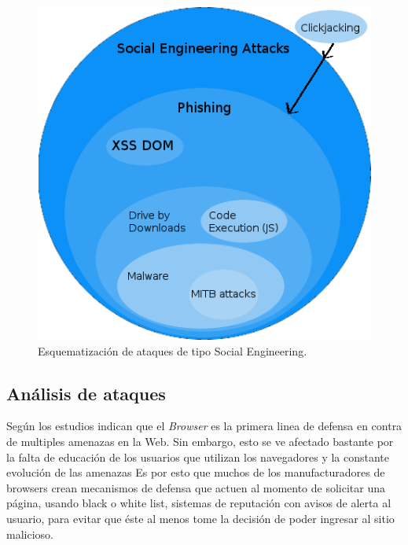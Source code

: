     \begin{figure}[h!t]
        \centering
        \includegraphics[scale=0.5]{figures/SEAttacks.png}
        \caption{Esquematización de ataques de tipo Social Engineering.}
        \label{fig:SEattack}
    \end{figure}

\subsection{Análisis de ataques}
    Según los estudios \cite{browSecPhish, Labs2013, rowSecSEMBlock} indican que el \textit{Browser} es la primera linea de defensa en contra de multiples amenazas en la Web. Sin embargo, esto se ve afectado bastante por la falta de educación de los usuarios que utilizan los navegadores y la constante evolución de las amenazas \cite{browSecPhish} Es por esto que muchos de los manufacturadores de browsers crean mecanismos de defensa \cite{Drake2011} que actuen al momento de solicitar una página, usando black o white list, sistemas de reputación \cite{Rajab2013} con avisos de alerta al usuario, para evitar que éste al menos tome la decisión de poder ingresar al sitio malicioso.

